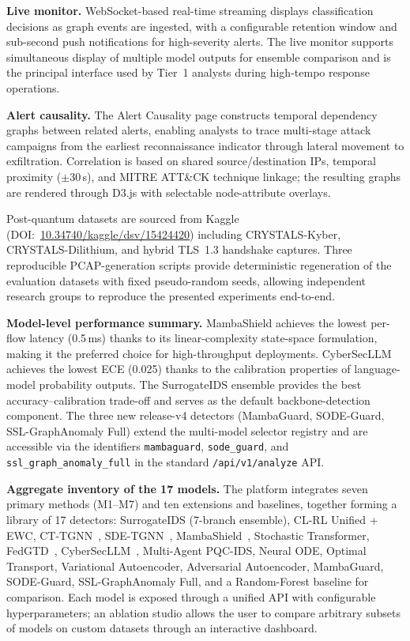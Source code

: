 \noindent\textbf{Live monitor.} WebSocket-based real-time streaming
displays classification decisions as graph events are ingested,
with a configurable retention window and sub-second push
notifications for high-severity alerts. The live monitor supports
simultaneous display of multiple model outputs for ensemble
comparison and is the principal interface used by Tier~1 analysts
during high-tempo response operations.

\noindent\textbf{Alert causality.} The Alert Causality page
constructs temporal dependency graphs between related alerts,
enabling analysts to trace multi-stage attack campaigns from the
earliest reconnaissance indicator through lateral movement to
exfiltration. Correlation is based on shared source/destination
IPs, temporal proximity ($\pm$30\,s), and MITRE ATT\&CK technique
linkage; the resulting graphs are rendered through D3.js with
selectable node-attribute overlays.

Post-quantum datasets are sourced from Kaggle (DOI:~\url{10.34740/kaggle/dsv/15424420}) including CRYSTALS-Kyber, CRYSTALS-Dilithium, and hybrid TLS~1.3 handshake captures. Three reproducible PCAP-generation scripts provide deterministic regeneration of the evaluation datasets with fixed pseudo-random seeds, allowing independent research groups to reproduce the presented experiments end-to-end.

\noindent\textbf{Model-level performance summary.} MambaShield achieves the lowest per-flow latency (0.5\,ms) thanks to its linear-complexity state-space formulation, making it the preferred choice for high-throughput deployments. CyberSecLLM achieves the lowest ECE (0.025) thanks to the calibration properties of language-model probability outputs. The SurrogateIDS ensemble provides the best accuracy--calibration trade-off and serves as the default backbone-detection component. The three new release-v4 detectors (MambaGuard, SODE-Guard, SSL-GraphAnomaly Full) extend the multi-model selector registry and are accessible via the identifiers \texttt{mambaguard}, \texttt{sode\_guard}, and \texttt{ssl\_graph\_anomaly\_full} in the standard \texttt{/api/v1/analyze} API.

\noindent\textbf{Aggregate inventory of the 17 models.} The platform integrates seven primary methods (M1--M7) and ten extensions and baselines, together forming a library of 17 detectors: SurrogateIDS (7-branch ensemble), CL-RL Unified + EWC, CT-TGNN~\cite{Anaedevha2025cais}, SDE-TGNN~\cite{Anaedevha2026sdetgnn}, MambaShield~\cite{Anaedevha2026mamba}, Stochastic Transformer, FedGTD~\cite{Anaedevha2026neurips}, CyberSecLLM~\cite{Anaedevha2026cybersecllm}, Multi-Agent PQC-IDS, Neural ODE, Optimal Transport, Variational Autoencoder, Adversarial Autoencoder, MambaGuard, SODE-Guard, SSL-GraphAnomaly Full, and a Random-Forest baseline for comparison. Each model is exposed through a unified API with configurable hyperparameters; an ablation studio allows the user to compare arbitrary subsets of models on custom datasets through an interactive dashboard.

